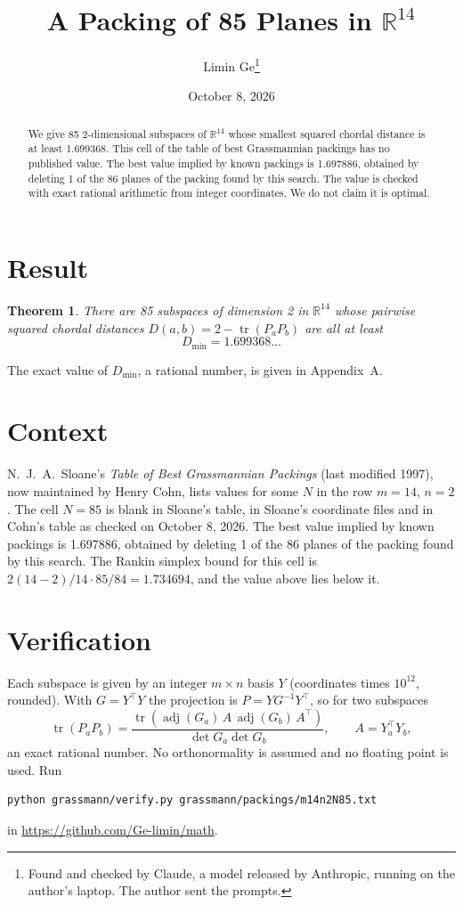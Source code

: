 \documentclass[11pt,a4paper]{article}
\title{A Packing of 85 Planes in $\mathbb{R}^{14}$}
\author{Limin Ge\thanks{Found and checked by Claude, a model released by Anthropic, running on the author's laptop. The author sent the prompts.}}
\date{October 8, 2026}
\newtheorem*{theorem}{Theorem}
\begin{document}
\maketitle
\begin{abstract}
We give 85 2-dimensional subspaces of $\mathbb{R}^{14}$ whose smallest squared chordal distance is at least 1.699368. This cell of the table of best Grassmannian packings has no published value. The best value implied by known packings is 1.697886, obtained by deleting 1 of the 86 planes of the packing found by this search. The value is checked with exact rational arithmetic from integer coordinates. We do not claim it is optimal.
\end{abstract}

\section{Result}
\begin{theorem}
There are 85 subspaces of dimension 2 in $\mathbb{R}^{14}$ whose pairwise squared chordal distances $D(a,b) = 2 - \operatorname{tr}(P_aP_b)$ are all at least
\[ D_{\min} = 1.699368\ldots \]
\end{theorem}
The exact value of $D_{\min}$, a rational number, is given in Appendix~A.


\section{Context}
N.~J.~A.~Sloane's \emph{Table of Best Grassmannian Packings} (last modified 1997), now maintained by Henry Cohn, lists values for some $N$ in the row $m=14$, $n=2$. The cell $N=85$ is blank in Sloane's table, in Sloane's coordinate files and in Cohn's table as checked on October 8, 2026. The best value implied by known packings is 1.697886, obtained by deleting 1 of the 86 planes of the packing found by this search. The Rankin simplex bound for this cell is $2(14-2)/14\cdot 85/84 = 1.734694$, and the value above lies below it.


\section{Verification}
Each subspace is given by an integer $m\times n$ basis $Y$ (coordinates times $10^{12}$, rounded). With $G=Y^\top Y$ the projection is $P=YG^{-1}Y^\top$, so for two subspaces
\[ \operatorname{tr}(P_aP_b)=\frac{\operatorname{tr}(\operatorname{adj}(G_a)\,A\,\operatorname{adj}(G_b)\,A^\top)}{\det G_a\det G_b},\qquad A=Y_a^\top Y_b, \]
an exact rational number. No orthonormality is assumed and no floating point is used. Run
\begin{verbatim}
python grassmann/verify.py grassmann/packings/m14n2N85.txt
\end{verbatim}
in \url{https://github.com/Ge-limin/math}.
\end{document}
